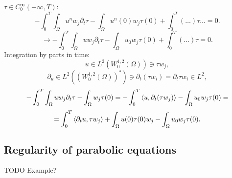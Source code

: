\documentclass[12pt]{article}					%
\begin{document}
\begin{veta}
	\begin{dukazin}
		$\tau \in C_0^∞(-∞, T)$:
		$$ -\int_0^T \int_\Omega u^n w_j \partial_t \tau - \int_\Omega u^n(0) w_j \tau(0) + \int_0^T (…) \tau … = 0. $$
		$$ \rightarrow -\int_0^T \int_\Omega u w_j \partial_t \tau - \int_\Omega u_0 w_j \tau(0) + \int_0^T (…) \tau = 0. $$
		Integration by parts in time:
		$$ u \in L^2(W_0^{1, 2}(\Omega)) \ni \tau w_j, $$
		$$ \partial_u \in L^2((W_0^{1, 2}(\Omega))^*) \ni \partial_t(\tau w_i) = \partial_t \tau w_i \in L^2, $$
		$$ -\int_0^T \int_\Omega u w_j \partial_t \tau - \int_\Omega w_j \tau(0) = -\int_0^T \left\langle u, \partial_t(\tau w_j)\right\rangle - \int_\Omega u_0 w_j \tau(0) = $$
		$$ = \int_0^T \left\langle\partial_t u, \tau w_j\right\rangle + \int_\Omega u(0) \tau(0) w_j - \int_\Omega u_0 w_j \tau(0).$$
	\end{dukazin}
\end{veta}

\subsection{Regularity of parabolic equations}
TODO Example?
\end{document}

